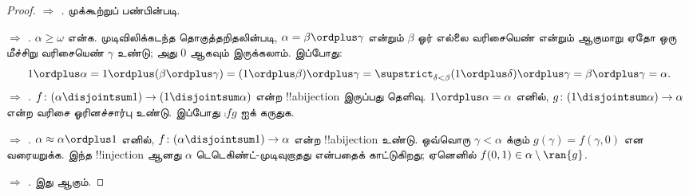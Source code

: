 \documentclass[../../../include/open-logic-section]{subfiles}
\begin{document}
\begin{proof}
\emph{ $\Rightarrow$ .}
முக்கூற்றுப் பண்பின்படி.

\emph{ $\Rightarrow$ .}
$\alpha \geq \omega$ என்க. முடிவிலிக்கடந்த தொகுத்தறிதலின்படி,
$\alpha = \beta \ordplus \gamma$ என்றும் $\beta$ ஓர் எல்லை
வரிசையெண் என்றும் ஆகுமாறு ஏதோ ஒரு மீச்சிறு வரிசையெண் $\gamma$
உண்டு; அது $0$ ஆகவும் இருக்கலாம். இப்போது:
\[
  1 \ordplus \alpha =
  1 \ordplus (\beta \ordplus \gamma) =
  (1 \ordplus \beta) \ordplus \gamma =
  \supstrict_{\delta < \beta} (1 \ordplus  \delta) \ordplus  \gamma =
  \beta \ordplus  \gamma =
  \alpha.
\]
\emph{ $\Rightarrow$ .}
$f \colon (\alpha \disjointsum 1) \to (1 \disjointsum \alpha)$
என்ற !!a{bijection} இருப்பது தெளிவு.
$1 \ordplus \alpha = \alpha$ எனில்,
$g \colon (1 \disjointsum \alpha) \to \alpha$ என்ற
வரிசை ஓரினச்சார்பு உண்டு. இப்போது $\comp{f}{g}$ ஐக் கருதுக.

\emph{ $\Rightarrow$ .}
$\alpha \approx \alpha \ordplus 1$ எனில்,
$f \colon (\alpha \disjointsum 1) \to \alpha$ என்ற
!!a{bijection} உண்டு. ஒவ்வொரு $\gamma < \alpha$ க்கும்
$g(\gamma) = f(\gamma, 0)$ என வரையறுக்க. இந்த
!!{injection} ஆனது $\alpha$ டெடெகிண்ட்-முடிவுறாதது என்பதைக்
காட்டுகிறது; ஏனெனில்
$f(0,1) \in \alpha \setminus \ran{g}$.

\emph{ $\Rightarrow$ .}
இது  ஆகும்.
\end{proof}
\end{document}
